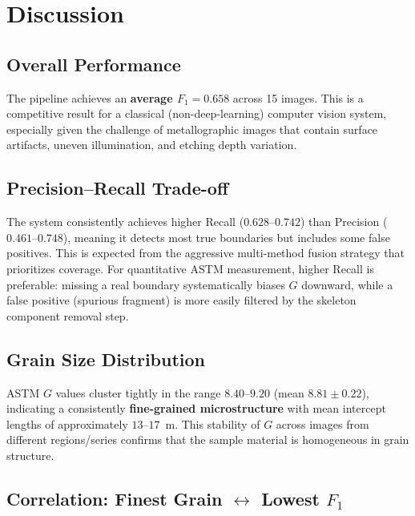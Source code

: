 \documentclass[12pt,a4paper]{article}
\begin{document}
\section{Discussion}

\subsection{Overall Performance}

The pipeline achieves an \textbf{average $F_1 = 0.658$} across 15 images.
This is a competitive result for a classical (non-deep-learning) computer
vision system, especially given the challenge of metallographic images that
contain surface artifacts, uneven illumination, and etching depth variation.

\subsection{Precision--Recall Trade-off}

The system consistently achieves higher Recall ($0.628$--$0.742$) than
Precision ($0.461$--$0.748$), meaning it detects most true boundaries but
includes some false positives. This is expected from the aggressive
multi-method fusion strategy that prioritizes coverage. For quantitative
ASTM measurement, higher Recall is preferable: missing a real boundary
systematically biases $G$ downward, while a false positive (spurious
fragment) is more easily filtered by the skeleton component removal step.

\subsection{Grain Size Distribution}

ASTM $G$ values cluster tightly in the range $8.40$--$9.20$ (mean
$8.81 \pm 0.22$), indicating a consistently \textbf{fine-grained
microstructure} with mean intercept lengths of approximately $13$--$17$~\textmu m.
This stability of $G$ across images from different regions/series confirms
that the sample material is homogeneous in grain structure.

\subsection{Correlation: Finest Grain $\leftrightarrow$ Lowest $F_1$}
\end{document}
